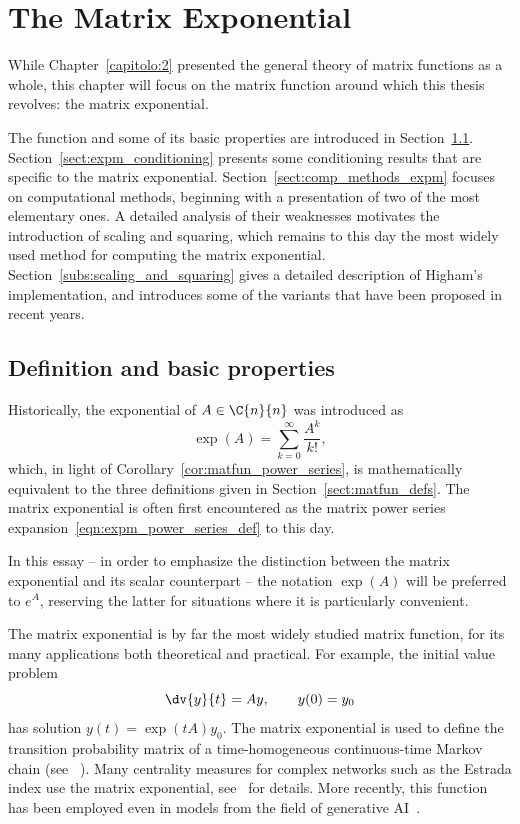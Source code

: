 \chapter{The Matrix Exponential}\label{capitolo:3}
While Chapter~\ref{capitolo:2} presented the general theory of matrix functions as a whole, this chapter will focus on the matrix function around which this thesis revolves: the matrix exponential. 

The function and some of its basic properties are introduced in Section~\ref{sect:expm_def_properties}. Section~\ref{sect:expm_conditioning} presents some conditioning results that are specific to the matrix exponential. Section~\ref{sect:comp_methods_expm} focuses on computational methods, beginning with a presentation of two of the most elementary ones. A detailed analysis of their weaknesses motivates the introduction of scaling and squaring, which remains to this day the most widely used method for computing the matrix exponential. Section~\ref{subs:scaling_and_squaring} gives a detailed description of Higham's implementation, and introduces some of the variants that have been proposed in recent years.


\section{Definition and basic properties}\label{sect:expm_def_properties}
Historically, the exponential of $A\in\C{n}{n}$ was introduced as
\begin{equation}\label{eqn:expm_power_series_def}
	\exp(A)=\sum_{k=0}^{\infty}\frac{A^k}{k!},
\end{equation}
which, in light of Corollary~\ref{cor:matfun_power_series}, is mathematically equivalent to the three definitions given in Section~\ref{sect:matfun_defs}.
The matrix exponential is often first encountered as the matrix power series expansion~\eqref{eqn:expm_power_series_def} to this day.

\begin{notazione*}
	In this essay -- in order to emphasize the distinction between the matrix exponential and its scalar counterpart -- the notation $\exp(A)$ will be preferred to $e^A$, reserving the latter for situations where it is particularly convenient.
\end{notazione*}

The matrix exponential is by far the most widely studied matrix function, for its many applications both theoretical and practical. For example, the initial value problem
\[
	\dv{y}{t} = Ay,\qquad y(0)=y_0
\]
has solution $y(t)=\exp(tA)y_0$. The matrix exponential is used to define the transition probability matrix of a time-homogeneous continuous-time Markov chain (see~\cite[§~2.3]{higham:matfun_book} \cite[§~2]{norris_1997:book}). Many centrality measures for complex networks such as the Estrada index use the matrix exponential, see~\cite{estrada:book} for details. More recently, this function has been employed even in models from the field of generative AI~\cite{article:pmlr-v119-xiao20a}.
\smallskip 

